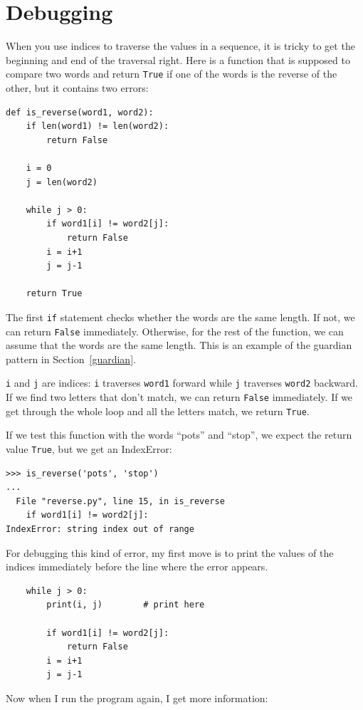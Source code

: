 \documentclass[10pt]{book}
\begin{document}
\section{Debugging}

When you use indices to traverse the values in a sequence,
it is tricky to get the beginning and end of the traversal
right.  Here is a function that is supposed to compare two
words and return {\tt True} if one of the words is the reverse
of the other, but it contains two errors:

\begin{verbatim}
def is_reverse(word1, word2):
    if len(word1) != len(word2):
        return False

    i = 0
    j = len(word2)

    while j > 0:
        if word1[i] != word2[j]:
            return False
        i = i+1
        j = j-1

    return True
\end{verbatim}
%
The first {\tt if} statement checks whether the words are the
same length.  If not, we can return {\tt False} immediately.
Otherwise, for the rest of the function, we can assume that the words
are the same length.  This is an example of the guardian pattern
in Section~\ref{guardian}.

{\tt i} and {\tt j} are indices: {\tt i} traverses {\tt word1}
forward while {\tt j} traverses {\tt word2} backward.  If we find
two letters that don't match, we can return {\tt False} immediately.
If we get through the whole loop and all the letters match, we
return {\tt True}.

If we test this function with the words ``pots'' and ``stop'', we
expect the return value {\tt True}, but we get an IndexError:

\begin{verbatim}
>>> is_reverse('pots', 'stop')
...
  File "reverse.py", line 15, in is_reverse
    if word1[i] != word2[j]:
IndexError: string index out of range
\end{verbatim}
%
For debugging this kind of error, my first move is to
print the values of the indices immediately before the line
where the error appears.

\begin{verbatim}
    while j > 0:
        print(i, j)        # print here

        if word1[i] != word2[j]:
            return False
        i = i+1
        j = j-1
\end{verbatim}
%
Now when I run the program again, I get more information:
\end{document}
